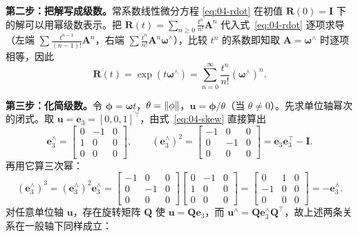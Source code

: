 \textbf{第二步：把解写成级数。}常系数线性微分方程 \eqref{eq:04-rdot} 在初值 $\bm{R}(0)=\bm{I}$ 下的解可以用幂级数表示。把 $\bm{R}(t)=\sum_{n\ge 0}\frac{t^{n}}{n!}\bm{A}^{n}$ 代入式~\eqref{eq:04-rdot} 逐项求导（左端 $\sum \frac{t^{n-1}}{(n-1)!}\bm{A}^{n}$，右端 $\sum\frac{t^{n}}{n!}\bm{A}^{n}\bm{\omega}^{\wedge}$），比较 $t^{n}$ 的系数即知取 $\bm{A}=\bm{\omega}^{\wedge}$ 时逐项相等，因此
\begin{equation}
  \bm{R}(t) = \exp\left(t\bm{\omega}^{\wedge}\right)
  = \sum_{n=0}^{\infty}\frac{t^{n}}{n!}\left(\bm{\omega}^{\wedge}\right)^{n}.
  \label{eq:04-series}
\end{equation}

\textbf{第三步：化简级数。}令 $\bm{\phi}=\bm{\omega}t$，$\theta=\left\lVert \phi \right\rVert$，$\bm{u}=\bm{\phi}/\theta$（当 $\theta\ne0$）。先求单位轴幂次的闭式。取 $\bm{u}=\bm{e}_3=[0,0,1]^{\top}$，由式~\eqref{eq:04-skew} 直接算出
\begin{equation}
  \bm{e}_3^{\wedge} = \begin{bmatrix}0&-1&0\\1&0&0\\0&0&0\end{bmatrix},\qquad
  \left(\bm{e}_3^{\wedge}\right)^{2} = \begin{bmatrix}-1&0&0\\0&-1&0\\0&0&0\end{bmatrix}
  = \bm{e}_3\bm{e}_3^{\top} - \bm{I}.
\end{equation}
再用它算三次幂：
\begin{equation}
  \left(\bm{e}_3^{\wedge}\right)^{3}
  = \left(\bm{e}_3^{\wedge}\right)^{2}\bm{e}_3^{\wedge}
  = \begin{bmatrix}-1&0&0\\0&-1&0\\0&0&0\end{bmatrix}
    \begin{bmatrix}0&-1&0\\1&0&0\\0&0&0\end{bmatrix}
  = \begin{bmatrix}0&1&0\\-1&0&0\\0&0&0\end{bmatrix}
  = -\bm{e}_3^{\wedge}.
\end{equation}
对任意单位轴 $\bm{u}$，存在旋转矩阵 $\bm{Q}$ 使 $\bm{u}=\bm{Q}\bm{e}_3$，而 $\bm{u}^{\wedge}=\bm{Q}\bm{e}_3^{\wedge}\bm{Q}^{\top}$，故上述两条关系在一般轴下同样成立：
